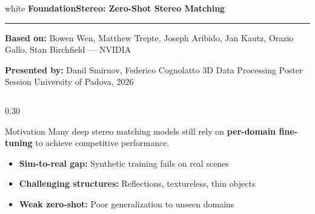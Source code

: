 \documentclass[final]{beamer}
\newcommand{\obullet}{\textcolor{posterOrange}{\textbullet}}
\begin{document}
\begin{frame}[t]

\begin{beamercolorbox}[wd=\paperwidth, leftskip=2.5cm, rightskip=2.5cm, vmode]{white}
  \color{posterOrange}
  \vspace{1.2cm}
  {\fontsize{72}{86}\selectfont\bfseries FoundationStereo: Zero-Shot Stereo Matching}\par
  \vspace{0.3cm}
  \textcolor{black}{\rule{\dimexpr\paperwidth-5cm\relax}{4pt}}\par
  \vspace{0.4cm}
  \color{black}
  {\fontsize{28}{34}\selectfont
    \textbf{Based on:} Bowen Wen, Matthew Trepte, Joseph Aribido, Jan Kautz, Orazio Gallo, Stan Birchfield --- NVIDIA}\par
  \vspace{0.25cm}
  {\fontsize{26}{32}\selectfont
    \textbf{Presented by:} Danil Smirnov, Federico Cognolatto
    \quad\textbullet\quad 3D Data Processing Poster Session
    \quad\textbullet\quad University of Padova, 2026}\par
  \vspace{1cm}
\end{beamercolorbox}

\vspace{0.5cm}

\begin{columns}[t, totalwidth=\paperwidth]
  \hspace{1cm}

  \begin{column}{0.30\paperwidth}

    \begin{block}{Motivation}
      Many deep stereo matching models still rely on \textbf{per-domain fine-tuning}
      to achieve competitive performance.
      \begin{itemize}\setlength\itemsep{0.4em}
        \item[\obullet] \textbf{Sim-to-real gap:} Synthetic training fails on real scenes
        \item[\obullet] \textbf{Challenging structures:} Reflections, textureless, thin objects
        \item[\obullet] \textbf{Weak zero-shot:} Poor generalization to unseen domains
      \end{itemize}
    \end{block}


\end{column}
\end{columns}
\end{frame}
\end{document}
